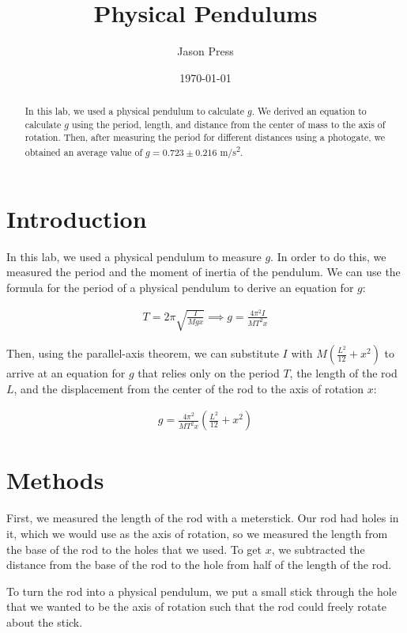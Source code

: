 \documentclass[12pt]{article}
\author{Jason Press}
\date{\today}
\title{Physical Pendulums}
\begin{document}
\maketitle
\begin{abstract}


In this lab, we used a physical pendulum to calculate \(g\). We derived an equation to calculate \(g\) using the period, length, and distance from the center of mass to the axis of rotation. Then, after measuring the period for different distances using a photogate, we obtained an average value of \(g = 0.723\pm0.216\) m/s\textsuperscript{2}.
\end{abstract}
\section{Introduction}
\label{sec:org14e673c}

In this lab, we used a physical pendulum to measure \(g\). In order to do this, we measured the period and the moment of inertia of the pendulum. We can use the formula for the period of a physical pendulum to derive an equation for \(g\):

\begin{align*}
T = 2\pi\sqrt{\frac{I}{Mgx}} \implies g = \frac{4\pi^2 I}{MT^2x}
\end{align*}

Then, using the parallel-axis theorem, we can substitute \(I\) with \(M \left( \frac{L^2}{12} + x^2 \right)\) to arrive at an equation for \(g\) that relies only on the period \(T\), the length of the rod \(L\), and the displacement from the center of the rod to the axis of rotation \(x\):

\begin{align}
g = \frac{4\pi^2}{MT^2x} \left( \frac{L^2}{12} + x^2 \right)
\end{align}
\section{Methods}
\label{sec:org8b43170}

First, we measured the length of the rod with a meterstick. Our rod had holes in it, which we would use as the axis of rotation, so we measured the length from the base of the rod to the holes that we used. To get \(x\), we subtracted the distance from the base of the rod to the hole from half of the length of the rod.

To turn the rod into a physical pendulum, we put a small stick through the hole that we wanted to be the axis of rotation such that the rod could freely rotate about the stick.
\end{document}
